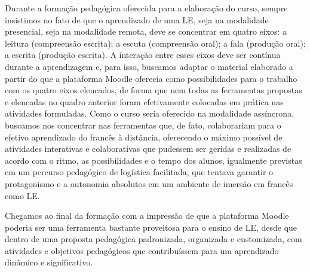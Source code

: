 Durante a formação pedagógica oferecida para a elaboração do curso,
sempre insistimos no fato de que o aprendizado de uma LE, seja na
modalidade presencial, seja na modalidade remota, deve se concentrar em
quatro eixos: a leitura (compreensão escrita); a escuta (compreensão
oral); a fala (produção oral); a escrita (produção escrita). A interação
entre esses eixos deve ser contínua durante a aprendizagem e, para isso,
buscamos adaptar o material elaborado a partir do que a plataforma
Moodle oferecia como possibilidades para o trabalho com os quatro eixos
elencados, de forma que nem todas as ferramentas propostas e elencadas
no quadro anterior foram efetivamente colocadas em prática nas
atividades formuladas. Como o curso seria oferecido na modalidade
assíncrona, buscamos nos concentrar nas ferramentas que, de fato,
colaborariam para o efetivo aprendizado do francês à distância,
oferecendo o máximo possível de atividades interativas e colaborativas
que pudessem ser geridas e realizadas de acordo com o ritmo, as
possibilidades e o tempo dos alunos, igualmente previstas em um percurso
pedagógico de logística facilitada, que tentava garantir o protagonismo
e a autonomia absolutos em um ambiente de imersão em francês como LE.

Chegamos ao final da formação com a impressão de que a plataforma Moodle
poderia ser uma ferramenta bastante proveitosa para o ensino de LE,
desde que dentro de uma proposta pedagógica padronizada, organizada e
customizada, com atividades e objetivos pedagógicos que contribuíssem
para um aprendizado dinâmico e significativo.